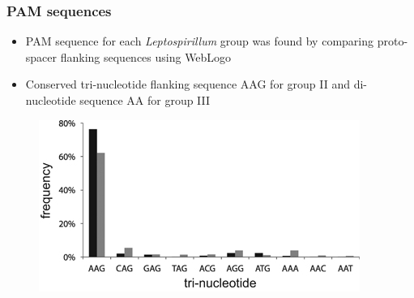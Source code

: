 \documentclass[10pt]{beamer}
\begin{document}
\begin{frame}[fragile]
	\frametitle{PAM sequences}
    
	\begin{itemize}
		\item PAM sequence for each \emph{Leptospirillum} group was found by comparing proto-spacer flanking sequences using WebLogo
        \item Conserved tri-nucleotide flanking sequence AAG for group II and di-nucleotide sequence AA for group III
	\end{itemize}
     \begin{figure}
    		\includegraphics[width=\textwidth,height=0.6\textheight,keepaspectratio]{ismej_fig3.jpg}
    \end{figure}

\end{frame}
\end{document}

